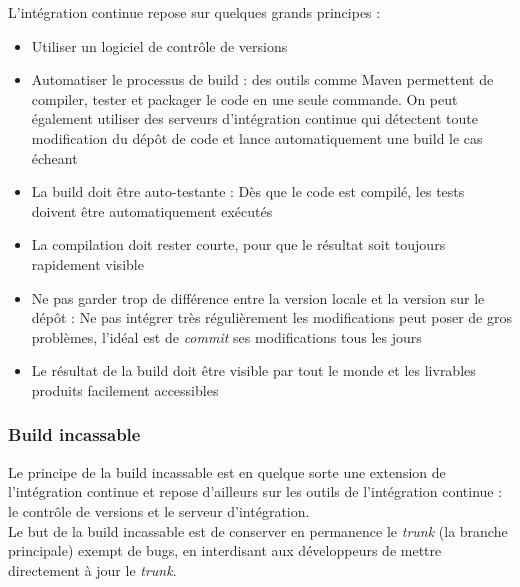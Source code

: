 L'intégration continue repose sur quelques grands principes :
\begin{itemize}
	\item Utiliser un logiciel de contrôle de versions
	\item Automatiser le processus de build : des outils comme Maven permettent de compiler, tester et packager le code en une seule commande. On peut également utiliser des serveurs d'intégration continue qui détectent toute modification du dépôt de code et lance automatiquement une build le cas écheant
	\item La build doit être \og auto-testante \fg{} : Dès que le code est compilé, les tests doivent être automatiquement exécutés
	\item La compilation doit rester courte, pour que le résultat soit toujours rapidement visible
	\item Ne pas garder trop de différence entre la version locale et la version sur le dépôt : Ne pas intégrer très régulièrement les modifications peut poser de gros problèmes, l'idéal est de \textit{commit} ses modifications tous les jours
	\item Le résultat de la build doit être visible par tout le monde et les livrables produits facilement accessibles\\
\end{itemize}


\subsubsection*{Build incassable}

Le principe de la build incassable est en quelque sorte une extension de l'intégration continue et repose d'ailleurs sur les outils de l'intégration continue : le contrôle de versions et le serveur d'intégration.\\
Le but de la build incassable est de conserver en permanence le \textit{trunk} (la branche principale) exempt de bugs, en interdisant aux développeurs de mettre directement à jour le \textit{trunk}.

